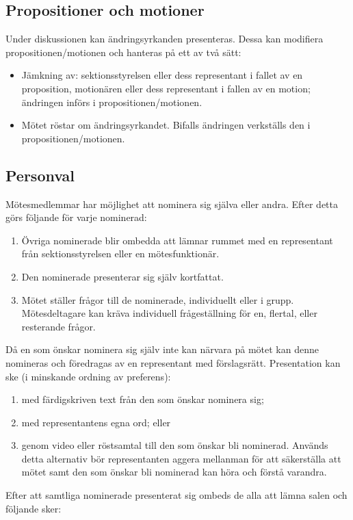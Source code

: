 \documentclass[11pt, includeaddress]{classes/cthit}
\begin{document}
\subsection{Propositioner och motioner}
Under diskussionen kan ändringsyrkanden presenteras.
Dessa kan modifiera propositionen/motionen och hanteras på ett av två sätt:
\begin{itemize}
    \item Jämkning av: sektionsstyrelsen eller dess representant i fallet av en proposition, motionären eller dess representant i fallen av en motion; ändringen införs i propositionen/motionen.
    \item Mötet röstar om ändringsyrkandet. Bifalls ändringen verkställs den i propositionen/motionen.
\end{itemize}

\subsection{Personval}
Mötesmedlemmar har möjlighet att nominera sig själva eller andra. Efter detta görs följande för varje nominerad:
\begin{enumerate}
    \item Övriga nominerade blir ombedda att lämnar rummet med en representant från sektionsstyrelsen eller en mötesfunktionär.
    \item Den nominerade presenterar sig själv kortfattat.
    \item Mötet ställer frågor till de nominerade, individuellt eller i grupp. Mötesdeltagare kan
kräva individuell frågeställning för en, flertal, eller resterande frågor.
\end{enumerate}
Då en som önskar nominera sig själv inte kan närvara på mötet kan denne nomineras
och föredragas av en representant med förslagsrätt. Presentation kan ske (i minskande
ordning av preferens):
\begin{enumerate}[label=(\alph*)]
    \item med färdigskriven text från den som önskar nominera sig;
    \item med representantens egna ord; eller
    \item genom video eller röstsamtal till den som önskar bli nominerad. Används detta alternativ bör representanten aggera mellanman för att säkerställa att mötet samt den som önskar bli nominerad kan höra och förstå varandra.
\end{enumerate}
Efter att samtliga nominerade presenterat sig ombeds de alla att lämna salen och följande sker:
\end{document}
